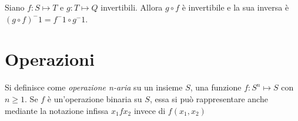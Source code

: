 
Siano $f:S \mapsto T$ e $g:T \mapsto Q$ invertibili. Allora $g \circ f$ è invertibile
e la sua inversa è $(g \circ f) ^ -1 = f^-1 \circ g ^ -1$.

\section{Operazioni}
Si definisce come \emph{operazione n-aria} su un insieme $S$, una funzione
$f:S^n \mapsto S$ con $n \geq 1$.
Se $f$ è un'operazione binaria su $S$, essa si può rappresentare anche mediante
la notazione infissa $x_1 f x_2$ invece di $f(x_1,x_2)$

